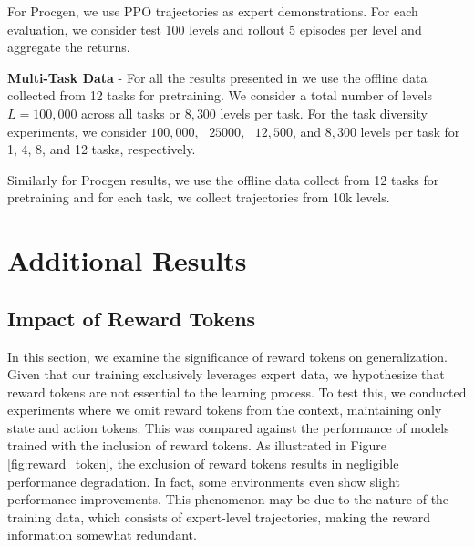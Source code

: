 For Procgen, we use PPO trajectories as expert demonstrations. For each evaluation, we consider test 100 levels and rollout 5 episodes per level and aggregate the returns. 




\textbf{Multi-Task Data} - For all the results presented in  we use the offline data collected from 12 tasks for pretraining. We consider a total number of levels $L = 100,000$ across all tasks or $8,300$ levels per task. For the task diversity experiments, we consider $100,000$, \ $25000$,  \ $12,500$, and $8,300$ levels per task for 1, 4, 8, and 12 tasks, respectively.

Similarly for Procgen results, we use the offline data collect from 12 tasks for pretraining and for each task, we collect trajectories from 10k levels. 

\label{app:sequence_construction}

\section{Additional Results}

\subsection{Impact of Reward Tokens}
In this section, we examine the significance of reward tokens on generalization. Given that our training exclusively leverages expert data, we hypothesize that reward tokens are not essential to the learning process. To test this, we conducted experiments where we omit reward tokens from the context, maintaining only state and action tokens. This was compared against the performance of models trained with the inclusion of reward tokens. As illustrated in Figure \ref{fig:reward_token}, the exclusion of reward tokens results in negligible performance degradation. In fact, some environments even show slight performance improvements. This phenomenon may be due to the nature of the training data, which consists of expert-level trajectories, making the reward information somewhat redundant.


